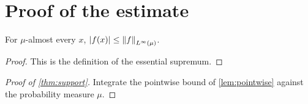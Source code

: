 
\section{Proof of the estimate}
\label{sec:estimate}

\begin{lemma}
\label{lem:pointwise}
For $\mu$-almost every $x$, $\left\lvert f(x) \right\rvert \le \left\lVert f \right\rVert_{L^\infty(\mu)}$.
\end{lemma}

\begin{proof}
This is the definition of the essential supremum.
\end{proof}

\begin{proof}[Proof of \cref{thm:support}]
Integrate the pointwise bound of \cref{lem:pointwise} against the
probability measure $\mu$.
\end{proof}
